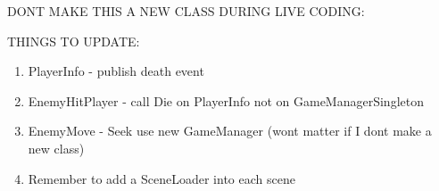 \documentclass{article}
\title{}
\begin{document}

\clearpage

\clearpage

\clearpage

\clearpage
DONT MAKE THIS A NEW CLASS DURING LIVE CODING:

THINGS TO UPDATE:
\begin{enumerate}
    \item PlayerInfo - publish death event
    \item EnemyHitPlayer - call Die on PlayerInfo not on GameManagerSingleton
    \item EnemyMove - Seek use new GameManager (wont matter if I dont make a new class)
    \item Remember to add a SceneLoader into each scene
\end{enumerate}
\end{document}
